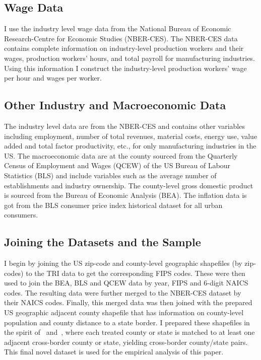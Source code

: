 \documentclass{C:/Users/david/OneDrive/Documents/ULMS/PhD/Thesis/chapter3/src/climate_change/latex/Economic_Journal/OUP-EJ}
\begin{document}
    \subsection{Wage Data}\label{subsec:wage-data}
    I use the industry level wage data from the National Bureau of Economic Research-Centre for Economic Studies (NBER-CES). The NBER-CES data contains complete information on industry-level production workers and their wages, production workers' hours, and total payroll for manufacturing industries. Using this information I construct the industry-level production workers' wage per hour and wages per worker.

    \subsection{Other Industry and Macroeconomic Data}\label{subsec:other-industry-and-macroeconomic-data}
    The industry level data are from the NBER-CES and contains other variables including employment, number of total revenues, material costs, energy use, value added and total factor productivity, etc., for only manufacturing industries in the US. The macroeconomic data are at the county sourced from the Quarterly Census of Employment and Wages (QCEW) of the US Bureau of Labour Statistics (BLS) and include variables such as the average number of establishments and industry ownership. The county-level gross domestic product is sourced from the Bureau of Economic Analysis (BEA). The inflation data is got from the BLS consumer price index historical dataset for all urban consumers.

    \subsection{Joining the Datasets and the Sample}\label{subsec:joining-the-datasets-and-the-sample}
    I begin by joining the US zip-code and county-level geographic shapefiles (by zip-codes) to the TRI data to get the corresponding FIPS codes. These were then used to join the BEA, BLS and QCEW data by year, FIPS and $6$-digit NAICS codes. The resulting data were further merged to the NBER-CES dataset by their NAICS codes. Finally, this merged data was then joined with the prepared US geographic adjacent county shapefile that has information on county-level population and county distance to a state border. I prepared these shapefiles in the spirit of~\citet{dube2010minimum} and~\citet{gopalan2021state}, where each treated county or state is matched to at least one adjacent cross-border county or state, yielding cross-border county/state pairs. This final novel dataset is used for the empirical analysis of this paper.
\end{document}
